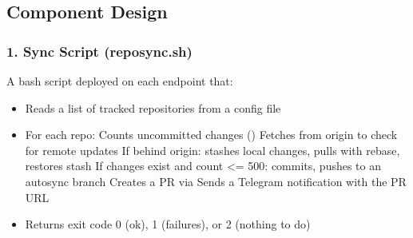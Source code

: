 \documentclass[letterpaper,10pt,openany,oneside,english]{sphinxmanual}
\begin{document}
\begin{sphinxVerbatim}[commandchars=\\\{\}]
                                    
           
        
\end{sphinxVerbatim}


\subsection{Component Design}
\label{\detokenize{proposed_solution:component-design}}

\subsubsection{1. Sync Script (repo\sphinxhyphen{}sync.sh)}
\label{\detokenize{proposed_solution:sync-script-repo-sync-sh}}
\sphinxAtStartPar
A bash script deployed on each endpoint that:
\begin{itemize}
\item {} 
\sphinxAtStartPar
Reads a list of tracked repositories from a config file

\item {} 
\sphinxAtStartPar
For each repo:
\sphinxhyphen{} Counts uncommitted changes ()
\sphinxhyphen{} Fetches from origin to check for remote updates
\sphinxhyphen{} If behind origin: stashes local changes, pulls with rebase, restores stash
\sphinxhyphen{} If changes exist and count \textless{}= 500: commits, pushes to an autosync branch
\sphinxhyphen{} Creates a PR via 
\sphinxhyphen{} Sends a Telegram notification with the PR URL

\item {} 
\sphinxAtStartPar
Returns exit code 0 (ok), 1 (failures), or 2 (nothing to do)

\end{itemize}
\end{document}
